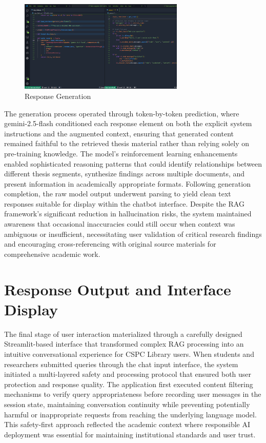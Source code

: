 \begin{refsection}
\begin{figure}[h]
    \centering
    \includegraphics[width=0.7\textwidth]{figures/resgen.png}
    \caption{Response Generation}
\end{figure}   

The generation process operated through token-by-token prediction, where gemini-2.5-flash conditioned each response element on both the explicit system instructions and the augmented context, ensuring that generated content remained faithful to the retrieved thesis material rather than relying solely on pre-training knowledge. The model's reinforcement learning enhancements enabled sophisticated reasoning patterns that could identify relationships between different thesis segments, synthesize findings across multiple documents, and present information in academically appropriate formats. Following generation completion, the raw model output underwent parsing to yield clean text responses suitable for display within the chatbot interface. Despite the RAG framework's significant reduction in hallucination risks, the system maintained awareness that occasional inaccuracies could still occur when context was ambiguous or insufficient, necessitating user validation of critical research findings and encouraging cross-referencing with original source materials for comprehensive academic work.

\section{Response Output and Interface Display}

The final stage of user interaction materialized through a carefully designed Streamlit-based interface that transformed complex RAG processing into an intuitive conversational experience for CSPC Library users. When students and researchers submitted queries through the chat input interface, the system initiated a multi-layered safety and processing protocol that ensured both user protection and response quality. The application first executed content filtering mechanisms to verify query appropriateness before recording user messages in the session state, maintaining conversation continuity while preventing potentially harmful or inappropriate requests from reaching the underlying language model. This safety-first approach reflected the academic context where responsible AI deployment was essential for maintaining institutional standards and user trust.


\end{refsection}

